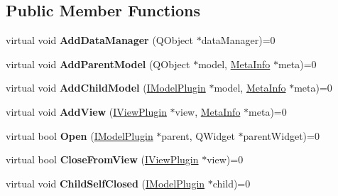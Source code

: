 \subsection*{Public Member Functions}
\begin{DoxyCompactItemize}
\item 
virtual void {\bfseries Add\+Data\+Manager} (Q\+Object $\ast$data\+Manager)=0\hypertarget{class_i_model_plugin_ab6612f3eaf63fcf66d61ca4522e6399a}{}\label{class_i_model_plugin_ab6612f3eaf63fcf66d61ca4522e6399a}

\item 
virtual void {\bfseries Add\+Parent\+Model} (Q\+Object $\ast$model, \hyperlink{struct_meta_info}{Meta\+Info} $\ast$meta)=0\hypertarget{class_i_model_plugin_a984044bf0128b7fe19b2871a244ed030}{}\label{class_i_model_plugin_a984044bf0128b7fe19b2871a244ed030}

\item 
virtual void {\bfseries Add\+Child\+Model} (\hyperlink{class_i_model_plugin}{I\+Model\+Plugin} $\ast$model, \hyperlink{struct_meta_info}{Meta\+Info} $\ast$meta)=0\hypertarget{class_i_model_plugin_a8427d2cff223c37abb0c4d856b244c4d}{}\label{class_i_model_plugin_a8427d2cff223c37abb0c4d856b244c4d}

\item 
virtual void {\bfseries Add\+View} (\hyperlink{class_i_view_plugin}{I\+View\+Plugin} $\ast$view, \hyperlink{struct_meta_info}{Meta\+Info} $\ast$meta)=0\hypertarget{class_i_model_plugin_aa209bc554d02bf3b04b64a7003a9ace4}{}\label{class_i_model_plugin_aa209bc554d02bf3b04b64a7003a9ace4}

\item 
virtual bool {\bfseries Open} (\hyperlink{class_i_model_plugin}{I\+Model\+Plugin} $\ast$parent, Q\+Widget $\ast$parent\+Widget)=0\hypertarget{class_i_model_plugin_a1d0eb900e7bb460ab957ae90fd966d76}{}\label{class_i_model_plugin_a1d0eb900e7bb460ab957ae90fd966d76}

\item 
virtual bool {\bfseries Close\+From\+View} (\hyperlink{class_i_view_plugin}{I\+View\+Plugin} $\ast$view)=0\hypertarget{class_i_model_plugin_ae6e9c6e8eb422b31d3a32c9c7bf60152}{}\label{class_i_model_plugin_ae6e9c6e8eb422b31d3a32c9c7bf60152}

\item 
virtual void {\bfseries Child\+Self\+Closed} (\hyperlink{class_i_model_plugin}{I\+Model\+Plugin} $\ast$child)=0\hypertarget{class_i_model_plugin_a19a398057393941101d581b98db4bedf}{}\label{class_i_model_plugin_a19a398057393941101d581b98db4bedf}

\end{DoxyCompactItemize}


